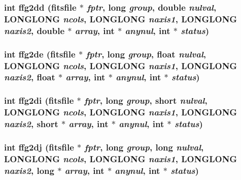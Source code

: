 \subsubsection{\setlength{\rightskip}{0pt plus 5cm}int ffg2dd (\bf{fitsfile} $\ast$ {\em fptr}, long {\em group}, double {\em nulval}, \bf{LONGLONG} {\em ncols}, \bf{LONGLONG} {\em naxis1}, \bf{LONGLONG} {\em naxis2}, double $\ast$ {\em array}, int $\ast$ {\em anynul}, int $\ast$ {\em status})}\label{fitsio_8h_2ba3df578b1fb9e9ca065bc4fbc519c8}


\subsubsection{\setlength{\rightskip}{0pt plus 5cm}int ffg2de (\bf{fitsfile} $\ast$ {\em fptr}, long {\em group}, float {\em nulval}, \bf{LONGLONG} {\em ncols}, \bf{LONGLONG} {\em naxis1}, \bf{LONGLONG} {\em naxis2}, float $\ast$ {\em array}, int $\ast$ {\em anynul}, int $\ast$ {\em status})}\label{fitsio_8h_36629153f5fd51962111d41048969a40}


\subsubsection{\setlength{\rightskip}{0pt plus 5cm}int ffg2di (\bf{fitsfile} $\ast$ {\em fptr}, long {\em group}, short {\em nulval}, \bf{LONGLONG} {\em ncols}, \bf{LONGLONG} {\em naxis1}, \bf{LONGLONG} {\em naxis2}, short $\ast$ {\em array}, int $\ast$ {\em anynul}, int $\ast$ {\em status})}\label{fitsio_8h_da4f58ff230b3af721108debfe6f714c}


\subsubsection{\setlength{\rightskip}{0pt plus 5cm}int ffg2dj (\bf{fitsfile} $\ast$ {\em fptr}, long {\em group}, long {\em nulval}, \bf{LONGLONG} {\em ncols}, \bf{LONGLONG} {\em naxis1}, \bf{LONGLONG} {\em naxis2}, long $\ast$ {\em array}, int $\ast$ {\em anynul}, int $\ast$ {\em status})}\label{fitsio_8h_d70a66cf5f02755193c64133ebff878d}


